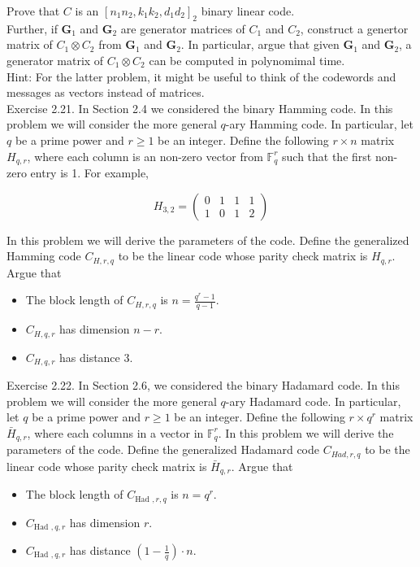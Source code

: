 \documentclass[10pt]{article}
\begin{document}
Prove that $C$ is an $\left[n_{1} n_{2}, k_{1} k_{2}, d_{1} d_{2}\right]_{2}$ binary linear code.\\
Further, if $\mathbf{G}_{1}$ and $\mathbf{G}_{2}$ are generator matrices of $C_{1}$ and $C_{2}$, construct a genertor matrix of $C_{1} \otimes C_{2}$ from $\mathbf{G}_{1}$ and $\mathbf{G}_{2}$. In particular, argue that given $\mathbf{G}_{1}$ and $\mathbf{G}_{2}$, a generator matrix of $C_{1} \otimes C_{2}$ can be computed in polynomimal time.\\
Hint: For the latter problem, it might be useful to think of the codewords and messages as vectors instead of matrices.\\
Exercise 2.21. In Section 2.4 we considered the binary Hamming code. In this problem we will consider the more general $q$-ary Hamming code. In particular, let $q$ be a prime power and $r \geq 1$ be an integer. Define the following $r \times n$ matrix $H_{q, r}$, where each column is an non-zero vector from $\mathbb{F}_{q}^{r}$ such that the first non-zero entry is 1. For example,

$$
H_{3,2}=\left(\begin{array}{llll}
0 & 1 & 1 & 1 \\
1 & 0 & 1 & 2
\end{array}\right)
$$

In this problem we will derive the parameters of the code. Define the generalized Hamming code $C_{H, r, q}$ to be the linear code whose parity check matrix is $H_{q, r}$. Argue that

\begin{itemize}
  \item[1.] The block length of $C_{H, r, q}$ is $n=\frac{q^{r}-1}{q-1}$.
  \item[2.] $C_{H, q, r}$ has dimension $n-r$.
  \item[3.] $C_{H, q, r}$ has distance 3.
\end{itemize}

Exercise 2.22. In Section 2.6, we considered the binary Hadamard code. In this problem we will consider the more general $q$-ary Hadamard code. In particular, let $q$ be a prime power and $r \geq 1$ be an integer. Define the following $r \times q^{r}$ matrix $\bar{H}_{q, r}$, where each columns in a vector in $\mathbb{F}_{q}^{r}$. In this problem we will derive the parameters of the code. Define the generalized Hadamard code $C_{H a d, r, q}$ to be the linear code whose parity check matrix is $\bar{H}_{q, r}$. Argue that

\begin{itemize}
  \item[1.] The block length of $C_{\text {Had }, r, q}$ is $n=q^{r}$.
  \item[2.] $C_{\text {Had }, q, r}$ has dimension $r$.
  \item[3.] $C_{\text {Had }, q, r}$ has distance $\left(1-\frac{1}{q}\right) \cdot n$.
\end{itemize}
\end{document}
